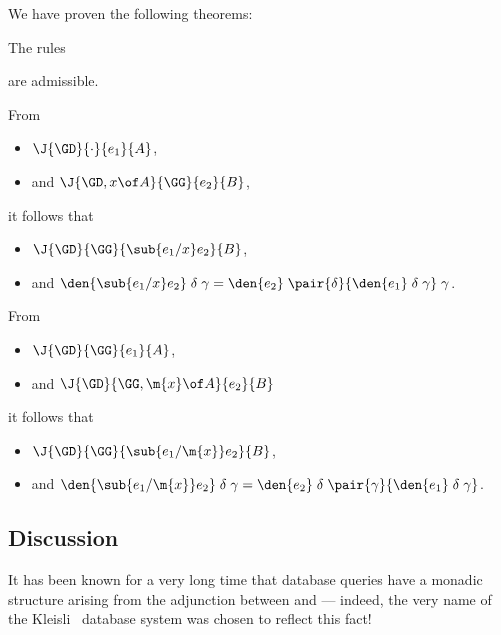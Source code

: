 We have proven the following theorems:

\begin{theorem}
  The rules 
  are admissible.
\end{theorem}

\begin{theorem}
  From
  \begin{itemize}
  \item $\J{\GD}{\cdot}{e_1}{A}$,
  \item and $\J{\GD,x \of A}{\GG}{e_2}{B}$,
  \end{itemize}
  it follows that
  \begin{itemize}
  \item $\J{\GD}{\GG}{\sub{e_1/x}e_2}{B}$,
  \item and $\den{\sub{e_1/x} e_2} \dg = \den{e_2} \;\pair{\delta}{\den{e_1}\dg}
    \;\gamma$.
  \end{itemize}
\end{theorem}

\begin{theorem}
  From
  \begin{itemize}
  \item $\J{\GD}{\GG}{e_1}{A}$,
  \item and $\J{\GD}{\GG,\m{x}\of A}{e_2}{B}$
  \end{itemize}
  it follows that
  \begin{itemize}
  \item $\J{\GD}{\GG}{\sub{e_1/\m{x}}e_2}{B}$,
  \item and $\den{\sub{e_1/\m{x}} e_2} \dg = \den{e_2} \;\delta
    \;\pair{\gamma}{\den{e_1} \dg}$.
  \end{itemize}
\end{theorem}

\subsection{Discussion}
It has been known for a very long time that database queries have a
monadic structure arising from the adjunction between \cSet and \cSL
--- indeed, the very name of the Kleisli~\cite{kleisli} database
system was chosen to reflect this fact!

